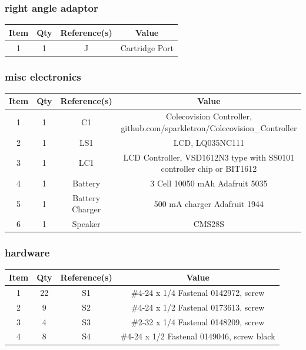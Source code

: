 \subsubsection{right angle adaptor}
\begin{footnotesize}
\begin{longtable}{ |*{4}{c|} }
\hline
{Item} & {Qty} & {Reference(s)} & {Value} \\
\hline
{1} & {1} & {J} & {Cartridge Port} \\
\hline
\end{longtable}
\end{footnotesize}

\subsubsection{misc electronics}
\begin{footnotesize}
\begin{longtable}{ |*{4}{c|} }
\hline
{Item} & {Qty} & {Reference(s)} & {Value} \\
\hline
{1} & {1} & {C1} & {Colecovision Controller, github.com/sparkletron/Colecovision\_Controller} \\
\hline
{2} & {1} & {LS1} & {LCD, LQ035NC111} \\
\hline
{3} & {1} & {LC1} & {LCD Controller, VS\-D1612\-N3 type with SS0101 controller chip or BIT1612} \\
\hline
{4} & {1} & {Battery} & {3 Cell 10050 mAh Adafruit 5035} \\
\hline
{5} & {1} & {Battery Charger} & {500 mA charger Adafruit 1944} \\
\hline
{6} & {1} & {Speaker} & {CMS\-4049\-28S} \\
\hline
\end{longtable}
\end{footnotesize}

\subsubsection{hardware}
\begin{footnotesize}
\begin{longtable}{ |*{4}{c|} }
\hline
{Item} & {Qty} & {Reference(s)} & {Value} \\
\hline
{1} & {22} & {S1} & {\#4-24 x 1/4 Fastenal 0142972, screw} \\
\hline
{2} & {9} & {S2} & {\#4-24 x 1/2 Fastenal 0173613, screw} \\
\hline
{3} & {4} & {S3} & {\#2-32 x 1/4 Fastenal 0148209, screw} \\
\hline
{4} & {8} & {S4} & {\#4-24 x 1/2 Fastenal 0149046, screw black} \\
\hline
\end{longtable}
\end{footnotesize}

